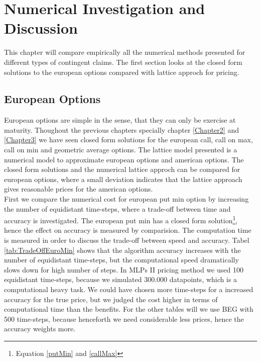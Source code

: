
\chapter{Numerical Investigation and Discussion} %

\label{Chapter6} %

This chapter will compare empirically all the numerical methods presented for different types of contingent claims. The first section looks at the closed form solutions to the european options compared with lattice approch for pricing.


\section{European Options}
European options are simple in the sense, that they can only be exercise at maturity. Thoughout the previous chapters specially chapter \ref{Chapter2} and \ref{Chapter3} we have seen closed form solutions for the european call, call on max, call on min and geometric average options. The lattice model presented is a numerical model to approximate european options and american options. The closed form solutions and the numerical lattice approch can be compared for european options, where a small deviation indicates that the lattice approach gives reasonable prices for the american options.\\

First we compare the numerical cost for european put min option by increasing the number of equidistant time-steps, where a trade-off between time and accuracy is investigated. The european put min has a closed form solution\footnote{Equation \eqref{putMin} and \eqref{callMax}}, hence the effect on accuracy is measured by comparision. The computation time is measured in order to discuss the trade-off between speed and accuracy. Tabel \ref{tab:TradeOffEuroMin} shows that the algorithm accuracy increases with the number of equidistant time-steps, but the computational speed dramatically slows down for high number of steps. In MLPs II pricing method we used 100 equidistant time-steps, because we simulated 300.000 datapoints, which is a computational heavy task. We could have chosen more time-steps for a increased accuracy for the true price, but we judged the cost higher in terms of computational time than the benefits. For the other tables will we use BEG with 500 time-steps, because henceforth we need considerable less prices, hence the accuracy weights more.\\

